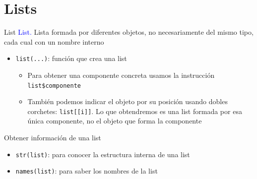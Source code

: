 \documentclass[
  ignorenonframetext,
]{beamer}
\providecommand{\tightlist}{%
  \setlength{\itemsep}{0pt}\setlength{\parskip}{0pt}}
\newcommand\blue[1]{\textcolor{blue}{#1}}
\begin{document}
\section{Lists}\label{lists}

\begin{frame}[fragile]{List}
\label{list}
\blue{List.} Lista formada por diferentes objetos, no necesariamente del
mismo tipo, cada cual con un nombre interno

\begin{itemize}
\tightlist
\item
  \texttt{list(...)}: función que crea una list

  \begin{itemize}
  \tightlist
  \item
    Para obtener una componente concreta usamos la instrucción
    \texttt{list\$componente}
  \item
    También podemos indicar el objeto por su posición usando dobles
    corchetes: \texttt{list{[}{[}i{]}{]}}. Lo que obtendremos es una
    list formada por esa única componente, no el objeto que forma la
    componente
  \end{itemize}
\end{itemize}
\end{frame}

\begin{frame}[fragile]{Obtener información de una list}
\label{obtener-informaciuxf3n-de-una-list}
\begin{itemize}
\tightlist
\item
  \texttt{str(list)}: para conocer la estructura interna de una list
\item
  \texttt{names(list)}: para saber los nombres de la list
\end{itemize}
\end{frame}
\end{document}
